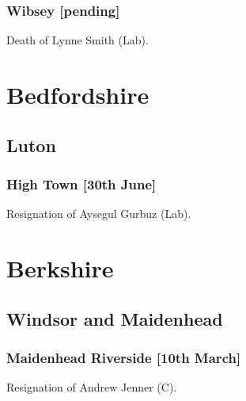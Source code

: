 \documentclass[a4paper,openany]{book}
\begin{document}
\begin{resultsiii}
\subsubsection*{Wibsey \hspace*{\fill}\nolinebreak[1]%
\enspace\hspace*{\fill}
[pending]}


Death of Lynne Smith (Lab).

\section{Bedfordshire}

\subsection*{Luton}

\subsubsection*{High Town \hspace*{\fill}\nolinebreak[1]%
\enspace\hspace*{\fill}
[30th June]}


Resignation of Aysegul Gurbuz (Lab).

\section{Berkshire}

\subsection*{Windsor and Maidenhead}

\subsubsection*{Maidenhead Riverside \hspace*{\fill}\nolinebreak[1]%
\enspace\hspace*{\fill}
[10th March]}


Resignation of Andrew Jenner (C).


\end{resultsiii}
\end{document}
